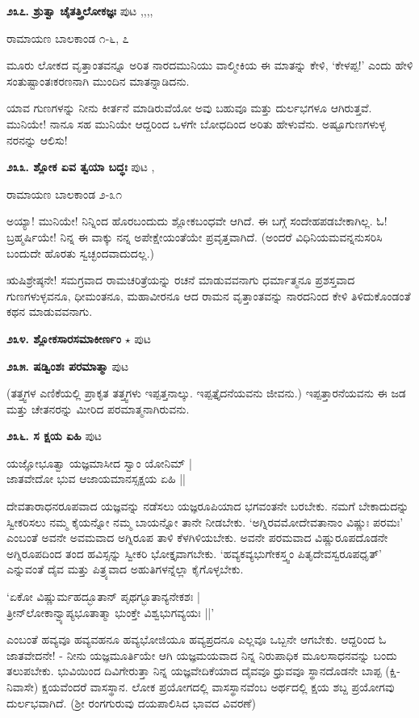 {\medskip
\noindent\textbf{೨೩೭. ಶ್ರುತ್ವಾ ಚೈತತ್ತ್ರಿಲೋಕಜ್ಞಃ} \hfill ಪುಟ \pageref{153},\pageref{163},\pageref{194},\pageref{246},\pageref{251}

\hfill ರಾಮಾಯಣ ಬಾಲಕಾಂಡ ೧-೬, ೭

ಮೂರು ಲೋಕದ ವೃತ್ತಾಂತವನ್ನೂ ಅರಿತ ನಾರದಮುನಿಯು ವಾಲ್ಮೀಕಿಯ ಈ ಮಾತನ್ನು ಕೇಳಿ, `ಕೇಳಪ್ಪ!' ಎಂದು ಹೇಳಿ ಸಂತುಷ್ಟಾಂತಃಕರಣನಾಗಿ ಮುಂದಿನ ಮಾತನ್ನಾಡಿದನು.

ಯಾವ ಗುಣಗಳನ್ನು ನೀನು ಕೀರ್ತನೆ ಮಾಡಿರುವೆಯೋ ಅವು ಬಹುವೂ ಮತ್ತು ದುರ್ಲಭಗಳೂ ಆಗಿರುತ್ತವೆ. ಮುನಿಯೇ! ನಾನೂ ಸಹ ಮುನಿಯೇ ಆದ್ದರಿಂದ ಒಳಗೇ ಬೋಧದಿಂದ ಅರಿತು ಹೇಳುವೆನು. ಅಷ್ಟೂಗುಣಗಳುಳ್ಳ ನರನನ್ನು ಆಲಿಸು!

\medskip
\noindent\textbf{೨೩೩. ಶ್ಲೋಕ ಏವ ತ್ವಯಾ ಬದ್ಧಃ} \hfill ಪುಟ \pageref{157},\pageref{181}

\hfill ರಾಮಾಯಣ ಬಾಲಕಾಂಡ ೨-೩೧

ಅಯ್ಯಾ! ಮುನಿಯೇ! ನಿನ್ನಿಂದ ಹೊರಬಂದುದು ಶ್ಲೋಕಬಂಧವೇ ಆಗಿದೆ. ಈ ಬಗ್ಗೆ ಸಂದೇಹಪಡಬೇಕಾಗಿಲ್ಲ. ಓ! ಬ್ರಹ್ಮರ್ಷಿಯೇ! ನಿನ್ನ ಈ ವಾಕ್ಕು  ನನ್ನ ಅಪೇಕ್ಷೇಯಂತೆಯೇ ಪ್ರವೃತ್ತವಾಗಿದೆ. (ಅಂದರೆ ವಿಧಿನಿಯಮವನ್ನನುಸರಿಸಿ ಬಂದುದೇ ಹೊರತು ಸ್ವಚ್ಛಂದವಾದುದಲ್ಲ.)

ಋಷಿಶ್ರೇಷ್ಠನೇ! ಸಮಗ್ರವಾದ ರಾಮಚರಿತ್ರೆಯನ್ನು ರಚನೆ ಮಾಡುವವನಾಗು ಧರ್ಮಾತ್ಮನೂ ಪ್ರಶಸ್ತವಾದ ಗುಣಗಳುಳ್ಳವನೂ, ಧೀಮಂತನೂ, ಮಹಾವೀರನೂ ಆದ ರಾಮನ ವೃತ್ತಾಂತವನ್ನು ನಾರದನಿಂದ ಕೇಳಿ ತಿಳಿದುಕೊಂಡಂತೆ ಕಥನ ಮಾಡುವವನಾಗು. 

\medskip
\noindent\textbf{೨೩೪. ಶ್ಲೋಕಸಾರಸಮಾಕೀರ್ಣಂ} $\star$ \hfill ಪುಟ \pageref{152}

\medskip
\noindent\textbf{೨೩೫. ಷಡ್ವಿಂಶಃ ಪರಮಾತ್ಮಾ} \hfill ಪುಟ \pageref{185}

(ತತ್ತ್ವಗಳ ಎಣಿಕೆಯಲ್ಲಿ ಪ್ರಾಕೃತ ತತ್ತ್ವಗಳು ಇಪ್ಪತ್ತನಾಲ್ಕು. ಇಪ್ಪತ್ತೈದನೆಯವನು ಜೀವನು.) ಇಪ್ಪತ್ತಾರನೆಯವನು ಈ ಜಡ ಮತ್ತು ಚೇತನರನ್ನು ಮೀರಿದ ಪರಮಾತ್ಮನಾಗಿರುವನು. 

\medskip
\noindent\textbf{೨೩೬. ಸ ಕ್ಷಯ ಏಹಿ} \hfill ಪುಟ \pageref{162}

\begin{shloka}
ಯಜ್ಞೋಭೂತ್ವಾ ಯಜ್ಞಮಾಸೀದ ಸ್ವಾಂ ಯೋನಿಮ್ |\\
ಜಾತವೇದೋ ಭುವ ಆಜಾಯಮಾನಸ್ಸಕ್ಷಯ ಏಹಿ ||
\end{shloka} 

ದೇವತಾರಾಧನರೂಪವಾದ ಯಜ್ಞವನ್ನು ನಡೆಸಲು ಯಜ್ಞರೂಪಿಯಾದ ಭಗವಂತನೇ ಬರಬೇಕು. ನಮಗೆ ಬೇಕಾದುದನ್ನು ಸ್ವೀಕರಿಸಲು ನಮ್ಮ ಕೈಯನ್ನೋ ನಮ್ಮ ಬಾಯನ್ನೋ ತಾನೇ ನೀಡಬೇಕು. `ಅಗ್ನಿರವಮೋದೇವತಾನಾಂ ವಿಷ್ಣುಃ ಪರಮಃ' ಎಂಬಂತೆ ಅವನೇ ಅವಮವಾದ ಅಗ್ನಿರೂಪ ತಾಳಿ ಕೆಳಗಿಳಿಯಬೇಕು. ಅವನೇ ಪರಮವಾದ ವಿಷ್ಣುರೂಪದೊಡನೇ ಅಗ್ನಿರೂಪದಿಂದ ತಂದ ಹವಿಸ್ಸನ್ನು ಸ್ವೀಕರಿ ಭೋಕ್ತೃವಾಗಬೇಕು. `ಹವ್ಯಕವ್ಯಭುಗೇಕಸ್ತ್ವಂ ಪಿತೃದೇವಸ್ವರೂಪಧೃತ್' ಎನ್ನುವಂತೆ ದೈವ ಮತ್ತು ಪಿತ್ರ್ಯವಾದ ಅಹುತಿಗಳನ್ನೆಲ್ಲಾ ಕೈಗೊಳ್ಳಬೇಕು.

\begin{shloka}
`ಏಕೋ ವಿಷ್ಣುರ್ಮಹದ್ಭೂತಾನ್ ಪೃಥಗ್ಭೂತಾನ್ಯನೇಕಶಃ |\\
ತ್ರೀನ್‌ಲೋಕಾನ್ವ್ಯಾಪ್ಯಭೂತಾತ್ಮಾ ಭುಂಕ್ತೇ ವಿಶ್ವಭುಗವ್ಯಯಃ ||'
\end{shloka}
ಎಂಬಂತೆ ಹವ್ಯವೂ ಹವ್ಯವಹನೂ ಹವ್ಯಭೋಜಿಯೂ ಹವ್ಯಪ್ರದನೂ ಎಲ್ಲವೂ ಒಬ್ಬನೇ ಆಗಬೇಕು. ಆದ್ದರಿಂದ ಓ ಜಾತವೇದನೇ! - ನೀನು ಯಜ್ಞಮೂರ್ತಿಯೇ ಆಗಿ ಯಜ್ಞಮಯವಾದ ನಿನ್ನ ನಿರುಪಾಧಿಕ ಮೂಲಸಾಧನವನ್ನು ಬಂದು ತಲುಪಬೇಕು. ಭುವಿಯಿಂದ ದಿವಿಗೇರುತ್ತಾ ನಿನ್ನ ಯಜ್ಞವೇದಿಕೆಯಾದ ದೈವವೂ ಧ್ರುವವೂ ಸ್ಥಾನದೊಡನೇ ಬಾಪ್ಪ (ಕ್ಷಿ-ನಿವಾಸೇ) ಕ್ಷಯವೆಂದರೆ ವಾಸಸ್ಥಾನ. ಲೋಕ ಪ್ರಯೋಗದಲ್ಲಿ ವಾಸಸ್ಥಾನವೆಂಬ ಅರ್ಥದಲ್ಲಿ ಕ್ಷಯ ಶಬ್ದ ಪ್ರಯೋಗವು ದುರ್ಲಭವಾಗಿದೆ. (ಶ್ರೀ ರಂಗಗುರುವು ದಯಪಾಲಿಸಿದ ಭಾವದ ವಿವರಣೆ)

}
